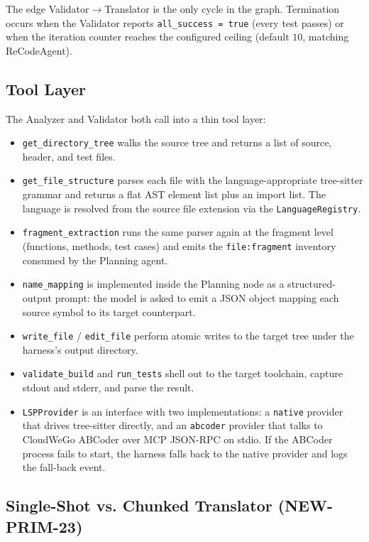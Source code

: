 The edge Validator$\rightarrow$Translator is the only cycle in the
graph. Termination occurs when the Validator reports
\texttt{all\_success = true} (every test passes) or when the iteration
counter reaches the configured ceiling (default $10$, matching
ReCodeAgent).

\subsection{Tool Layer}

The Analyzer and Validator both call into a thin tool layer:

\begin{itemize}
\item \texttt{get\_directory\_tree} walks the source tree and returns a
list of source, header, and test files.
\item \texttt{get\_file\_structure} parses each file with the
language-appropriate tree-sitter grammar and returns a flat AST element
list plus an import list. The language is resolved from the source
file extension via the \texttt{LanguageRegistry}.
\item \texttt{fragment\_extraction} runs the same parser again at the
fragment level (functions, methods, test cases) and emits the
\texttt{file:fragment} inventory consumed by the Planning agent.
\item \texttt{name\_mapping} is implemented inside the Planning node as
a structured-output prompt: the model is asked to emit a JSON object
mapping each source symbol to its target counterpart.
\item \texttt{write\_file} / \texttt{edit\_file} perform atomic writes
to the target tree under the harness's output directory.
\item \texttt{validate\_build} and \texttt{run\_tests} shell out to the
target toolchain, capture stdout and stderr, and parse the result.
\item \texttt{LSPProvider} is an interface with two implementations: a
\texttt{native} provider that drives tree-sitter directly, and an
\texttt{abcoder} provider that talks to CloudWeGo ABCoder over MCP
JSON-RPC on stdio. If the ABCoder process fails to start, the harness
falls back to the native provider and logs the fall-back event.
\end{itemize}

\subsection{Single-Shot vs. Chunked Translator (NEW-PRIM-23)}

